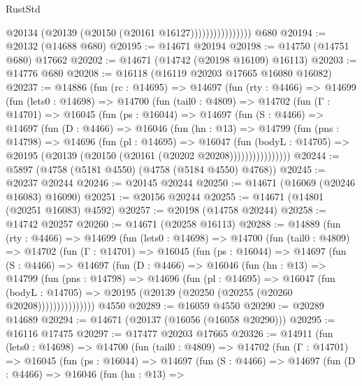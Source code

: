 \begin{lexlean}{RustStd}
\begin{coremodule}
                            @20134 (@20139 (@20150 (@20161 @16127))))))))))))))))
    @680
@20194 := @20132 (@14688 @680)
@20195 := @14671 @20194
@20198 := @14750 (@14751 @680) @17662
@20202 := @14671 (@14742 (@20198 @16109) @16113)
@20203 := @14776 @680
@20208 := @16118 (@16119 @20203 @17665 @16080 @16082)
@20237 := @14886
    (fun (rc : @14695) =>
    @14697
      (fun (rty : @4466) =>
      @14699
        (fun (lets0 : @14698) =>
        @14700
          (fun (tail0 : @4809) =>
          @14702
            (fun (Γ : @14701) =>
            @16045
              (fun (ps : @16044) =>
              @14697
                (fun (S : @4466) =>
                @14697
                  (fun (D : @4466) =>
                  @16046
                    (fun (hn : @13) =>
                    @14799
                      (fun (pns : @14798) =>
                      @14696
                        (fun (pl : @14695) =>
                        @16047
                          (fun (bodyL : @14705) =>
                          @20195 (@20139 (@20150 (@20161 (@20202 @20208))))))))))))))))
@20244 := @5897 (@4758 (@5181 @4550) (@4758 (@5184 @4550) @4768))
@20245 := @20237 @20244
@20246 := @20145 @20244
@20250 := @14671 (@16069 (@20246 @16083) @16090)
@20251 := @20156 @20244
@20255 := @14671 (@14801 (@20251 @16083) @4592)
@20257 := @20198 (@14758 @20244)
@20258 := @14742 @20257
@20260 := @14671 (@20258 @16113)
@20288 := @14889
    (fun (rty : @4466) =>
    @14699
      (fun (lets0 : @14698) =>
      @14700
        (fun (tail0 : @4809) =>
        @14702
          (fun (Γ : @14701) =>
          @16045
            (fun (ps : @16044) =>
            @14697
              (fun (S : @4466) =>
              @14697
                (fun (D : @4466) =>
                @16046
                  (fun (hn : @13) =>
                  @14799
                    (fun (pns : @14798) =>
                    @14696
                      (fun (pl : @14695) =>
                      @16047
                        (fun (bodyL : @14705) =>
                        @20195 (@20139 (@20250 (@20255 (@20260 @20208)))))))))))))))
    @4550
@20289 := @16059 @4550
@20290 := @20289 @14689
@20294 := @14671 (@20137 (@16056 (@16058 @20290)))
@20295 := @16116 @17475
@20297 := @17477 @20203 @17665
@20326 := @14911
    (fun (lets0 : @14698) =>
    @14700
      (fun (tail0 : @4809) =>
      @14702
        (fun (Γ : @14701) =>
        @16045
          (fun (ps : @16044) =>
          @14697
            (fun (S : @4466) =>
            @14697
              (fun (D : @4466) =>
              @16046
                (fun (hn : @13) =>

\end{coremodule}
\end{lexlean}
